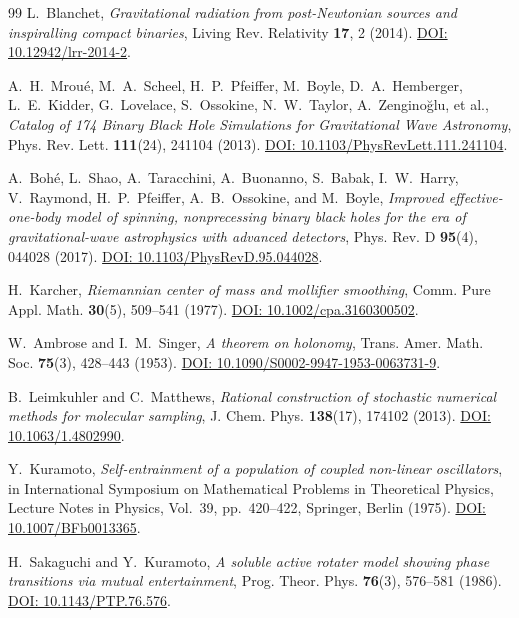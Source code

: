 \documentclass[11pt,a4paper,reqno]{article}
\theoremstyle{plain}
\theoremstyle{definition}
\theoremstyle{remark}
\numberwithin{equation}{section}
\begin{document}
\begin{thebibliography}{99}
L.~Blanchet, \textit{Gravitational radiation from post-Newtonian sources and inspiralling compact binaries}, Living Rev. Relativity \textbf{17}, 2 (2014). \href{https://doi.org/10.12942/lrr-2014-2}{DOI: 10.12942/lrr-2014-2}.

A.~H.~Mrou{\'e}, M.~A.~Scheel, H.~P.~Pfeiffer, M.~Boyle, D.~A.~Hemberger, L.~E.~Kidder, G.~Lovelace, S.~Ossokine, N.~W.~Taylor, A.~Zengino{\u{g}}lu, et al., \textit{Catalog of 174 Binary Black Hole Simulations for Gravitational Wave Astronomy}, Phys. Rev. Lett. \textbf{111}(24), 241104 (2013). \href{https://doi.org/10.1103/PhysRevLett.111.241104}{DOI: 10.1103/PhysRevLett.111.241104}.

A.~Boh{\'e}, L.~Shao, A.~Taracchini, A.~Buonanno, S.~Babak, I.~W.~Harry, V.~Raymond, H.~P.~Pfeiffer, A.~B.~Ossokine, and M.~Boyle, \textit{Improved effective-one-body model of spinning, nonprecessing binary black holes for the era of gravitational-wave astrophysics with advanced detectors}, Phys. Rev. D \textbf{95}(4), 044028 (2017). \href{https://doi.org/10.1103/PhysRevD.95.044028}{DOI: 10.1103/PhysRevD.95.044028}.

H.~Karcher, \textit{Riemannian center of mass and mollifier smoothing}, Comm. Pure Appl. Math. \textbf{30}(5), 509--541 (1977). \href{https://doi.org/10.1002/cpa.3160300502}{DOI: 10.1002/cpa.3160300502}.

W.~Ambrose and I.~M.~Singer, \textit{A theorem on holonomy}, Trans. Amer. Math. Soc. \textbf{75}(3), 428--443 (1953). \href{https://doi.org/10.1090/S0002-9947-1953-0063731-9}{DOI: 10.1090/S0002-9947-1953-0063731-9}.

B.~Leimkuhler and C.~Matthews, \textit{Rational construction of stochastic numerical methods for molecular sampling}, J. Chem. Phys. \textbf{138}(17), 174102 (2013). \href{https://doi.org/10.1063/1.4802990}{DOI: 10.1063/1.4802990}.

Y.~Kuramoto, \textit{Self-entrainment of a population of coupled non-linear oscillators}, in International Symposium on Mathematical Problems in Theoretical Physics, Lecture Notes in Physics, Vol.~39, pp.~420--422, Springer, Berlin (1975). \href{https://doi.org/10.1007/BFb0013365}{DOI: 10.1007/BFb0013365}.

H.~Sakaguchi and Y.~Kuramoto, \textit{A soluble active rotater model showing phase transitions via mutual entertainment}, Prog. Theor. Phys. \textbf{76}(3), 576--581 (1986). \href{https://doi.org/10.1143/PTP.76.576}{DOI: 10.1143/PTP.76.576}.


\end{thebibliography}
\end{document}
